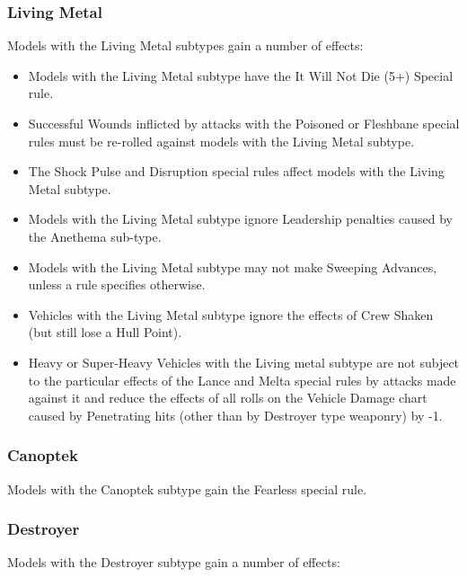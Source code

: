 \subsubsection{Living Metal} \label{Living Metal}

Models with the Living Metal subtypes gain a number of effects:

\begin{itemize}
	\item Models with the Living Metal subtype have the It Will Not Die (5+) Special rule.
	\item Successful Wounds inflicted by attacks with the Poisoned or Fleshbane special rules must be re-rolled against models with the Living Metal subtype.
	\item The Shock Pulse and Disruption special rules affect models with the Living Metal subtype.
	\item Models with the Living Metal subtype ignore Leadership penalties caused by the Anethema sub-type.
	\item Models with the Living Metal subtype may not make Sweeping Advances, unless a rule specifies otherwise.
\end{itemize} 

\begin{itemize}
	\item Vehicles with the Living Metal subtype ignore the effects of Crew Shaken (but still lose a Hull Point).
	\item Heavy or Super-Heavy Vehicles with the Living metal subtype are not subject to the particular effects of the Lance and Melta special rules by attacks made against it and reduce the effects of all rolls on the Vehicle Damage chart caused by Penetrating hits (other than by Destroyer type weaponry) by -1.
\end{itemize} 

\subsubsection{Canoptek} \label{Canoptek}

Models with the Canoptek subtype gain the Fearless special rule. \\

\subsubsection{Destroyer} \label{Destroyer}

Models with the Destroyer subtype gain a number of effects:

